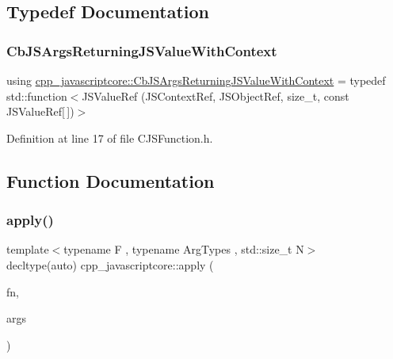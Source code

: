 \subsection{Typedef Documentation}
\mbox{\label{namespacecpp__javascriptcore_ade392e059225cd35b14b1b7efb9d5a5b}} 
\subsubsection{\texorpdfstring{Cb\+J\+S\+Args\+Returning\+J\+S\+Value\+With\+Context}{CbJSArgsReturningJSValueWithContext}}
{\footnotesize\ttfamily using \mbox{\hyperlink{namespacecpp__javascriptcore_ade392e059225cd35b14b1b7efb9d5a5b}{cpp\+\_\+javascriptcore\+::\+Cb\+J\+S\+Args\+Returning\+J\+S\+Value\+With\+Context}} = typedef std\+::function$<$J\+S\+Value\+Ref (J\+S\+Context\+Ref, J\+S\+Object\+Ref, size\+\_\+t, const J\+S\+Value\+Ref\mbox{[}$\,$\mbox{]})$>$}



Definition at line 17 of file C\+J\+S\+Function.\+h.



\subsection{Function Documentation}
\mbox{\label{namespacecpp__javascriptcore_ae99580d5a07367766396914230c5cb4a}} 
\subsubsection{\texorpdfstring{apply()}{apply()}}
{\footnotesize\ttfamily template$<$typename F , typename Arg\+Types , std\+::size\+\_\+t N$>$ \\
decltype(auto) cpp\+\_\+javascriptcore\+::apply (\begin{DoxyParamCaption}\item[{F}]{fn,  }\item[{Arg\+Types \&}]{args }\end{DoxyParamCaption})}



